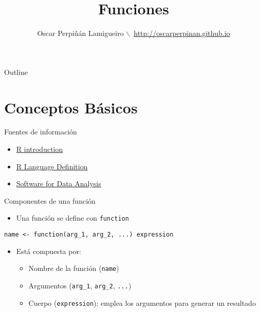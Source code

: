 \documentclass[xcolor={usenames,svgnames,dvipsnames}]{beamer}
\author{Oscar Perpiñán Lamigueiro $\backslash$\ \url{http://oscarperpinan.github.io}}
\date{}
\title{Funciones}
\begin{document}
\maketitle
\begin{frame}{Outline}
\tableofcontents
\end{frame}



\section{Conceptos Básicos}
\label{sec:orgheadline12}

\begin{frame}[label={sec:orgheadline1}]{Fuentes de información}
\begin{itemize}
\item \href{http://cran.r-project.org/doc/manuals/R-intro.html}{R introduction}
\item \href{http://cran.r-project.org/doc/manuals/R-lang.html}{R Language Definition}
\item \href{http://www.springer.com/gb/book/9780387759357}{Software for Data Analysis}
\end{itemize}
\end{frame}
\begin{frame}[fragile,label={sec:orgheadline2}]{Componentes de una función}
 \begin{itemize}
\item Una función se define con \texttt{function}
\end{itemize}
\begin{center}
\texttt{name <- function(arg\_1, arg\_2, ...) expression}
\end{center}
\begin{itemize}
\item Está compuesta por:
\begin{itemize}
\item Nombre de la función (\texttt{name})
\item Argumentos (\texttt{arg\_1}, \texttt{arg\_2}, \texttt{...})
\item Cuerpo (\texttt{expression}): emplea los argumentos para generar un resultado
\end{itemize}
\end{itemize}
\end{frame}
\end{document}
